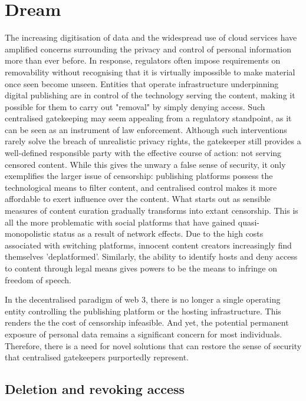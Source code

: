 


\section{Dream}

The increasing digitisation of data and the widespread use of cloud services have amplified concerns surrounding the privacy and control of personal information more than ever before. 
In response, regulators often impose requirements on removability without recognising that it is virtually impossible to make material once seen become unseen.
Entities that operate infrastructure underpinning digital publishing are in control of the technology serving the content, making it possible for them to carry out "removal" by simply denying access.
Such centralised gatekeeping may seem appealing from a regulatory standpoint, as it can be seen as an instrument of law enforcement. Although such interventions rarely solve the breach of unrealistic privacy rights, the gatekeeper still provides a well-defined responsible party with the effective course of action: not serving censored content.
While this gives the unwary a false sense of security, it only exemplifies the larger issue of censorship: publishing platforms possess the technological means to filter content, and centralised control makes it more affordable to exert influence over the content.  What starts out as sensible measures of content curation gradually transforms into extant censorship. This is all the more problematic with social platforms that have gained quasi-monopolistic status as a result of network effects. Due to the high costs associated with switching platforms, innocent content creators increasingly find themselves 'deplatformed'. Similarly, the ability to identify hosts and deny access to content through legal means gives powers to be the means to infringe on freedom of speech. 

In the decentralised paradigm of web 3, there is no longer a single operating entity controlling the publishing platform or the hosting infrastructure. This renders the the cost of censorship infeasible. And yet, the potential permanent exposure of personal data remains a significant concern for most individuals. Therefore, there is a need for novel solutions that can restore the sense of security that centralised gatekeepers purportedly represent. 

\subsection{Deletion and revoking access}

